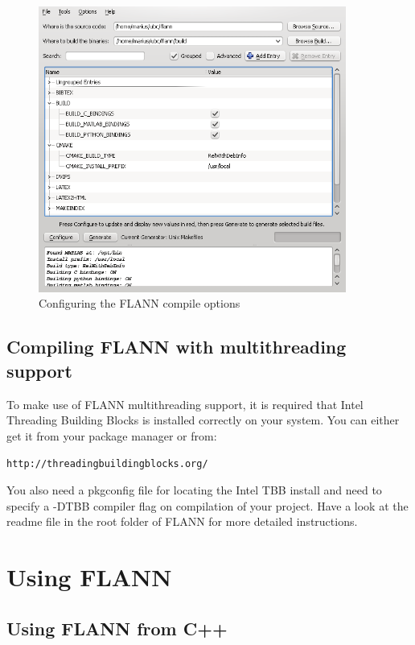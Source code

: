 \documentclass[letter,10pt]{article}
\begin{document}
\begin{figure}[h]
  \begin{center}
    \includegraphics[width=0.9\textwidth]{images/cmake-gui.png}
    \caption{Configuring the FLANN compile options}
    \label{fig:cmake-gui}
  \end{center}
\end{figure}

\subsection{Compiling FLANN with multithreading support}
To make use of FLANN multithreading support, it is required that Intel Threading Building Blocks is installed correctly
on your system. You can either get it from your package manager or from:
\begin{center}
    \texttt{http://threadingbuildingblocks.org/}
\end{center}

You also need a pkgconfig file for locating the Intel TBB install and need to specify a -DTBB compiler flag on compilation
of your project. Have a look at the readme file in the root folder of FLANN for more detailed instructions.

\section{Using FLANN}

\subsection{Using FLANN from C++}
\end{document}
